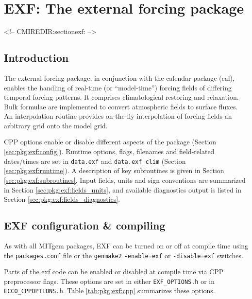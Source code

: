 \section{EXF: The external forcing package
\label{sec:pkg:exf}}
\begin{rawhtml}
<!-- CMIREDIR:sectionexf: -->
\end{rawhtml}


\subsection{Introduction
\label{sec:pkg:exf:intro}}

The external forcing package, in conjunction with the
calendar package (cal), enables the handling of real-time
(or ``model-time'') forcing
fields of differing temporal forcing patterns.
It comprises climatological restoring and relaxation.
Bulk formulae are implemented to convert atmospheric fields
to surface fluxes.
An interpolation routine provides on-the-fly interpolation of
forcing fields an arbitrary grid onto the model grid.

CPP options enable or disable different aspects of the package
(Section \ref{sec:pkg:exf:config}).
Runtime options, flags, filenames and field-related dates/times are
set in \texttt{data.exf} and \texttt{data.exf\_clim}
(Section \ref{sec:pkg:exf:runtime}).
A description of key subroutines is given in Section
\ref{sec:pkg:exf:subroutines}.
Input fields, units and sign conventions are summarized in
Section \ref{sec:pkg:exf:fields_units}, and available diagnostics
output is listed in Section \ref{sec:pkg:exf:fields_diagnostics}.


\subsection{EXF configuration \& compiling
\label{sec:pkg:exf:config}}

As with all MITgcm packages, EXF can be turned on or off at compile time
using the \texttt{packages.conf} file or the \texttt{genmake2}
\texttt{-enable=exf} or \texttt{-disable=exf} switches.

Parts of the exf code can be enabled or disabled at compile time
via CPP preprocessor flags. These options are set in either
\texttt{EXF\_OPTIONS.h} or in \texttt{ECCO\_CPPOPTIONS.h}.
Table \ref{tab:pkg:exf:cpp} summarizes these options.

